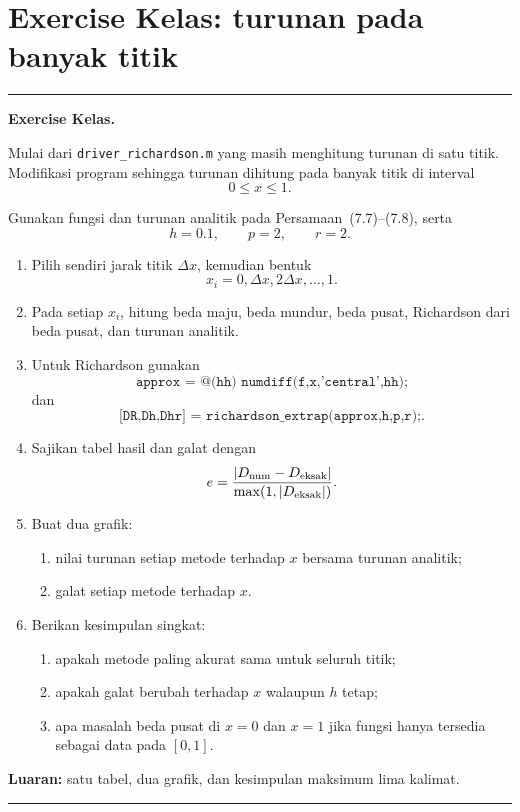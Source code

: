 \documentclass[book,english,noindex,lean,nobackpage,nocopyright,noupdate,nofiglist,notablist]{enacom}
\begin{document}
\section{Exercise Kelas: turunan pada banyak titik}
\par\medskip\noindent
\begin{center}
\begin{minipage}{0.94\textwidth}
\hrule\medskip
\textbf{Exercise Kelas.}\par\smallskip
Mulai dari \texttt{driver\_richardson.m} yang masih menghitung turunan di satu titik.
Modifikasi program sehingga turunan dihitung pada banyak titik di interval
\[
0\le x\le 1.
\]

Gunakan fungsi dan turunan analitik pada Persamaan~(7.7)--(7.8), serta
\[
h=0.1,\qquad p=2,\qquad r=2.
\]

\begin{enumerate}
\item Pilih sendiri jarak titik $\Delta x$, kemudian bentuk
\[
x_i=0,\Delta x,2\Delta x,\ldots,1.
\]

\item Pada setiap $x_i$, hitung beda maju, beda mundur, beda pusat, Richardson dari beda pusat,
dan turunan analitik.

\item Untuk Richardson gunakan
\[
\texttt{approx = @(hh) numdiff(f,x,'central',hh);}
\]
dan
\[
\texttt{[DR,Dh,Dhr] = richardson\_extrap(approx,h,p,r);}.
\]

\item Sajikan tabel hasil dan galat dengan
\[
e=\frac{|D_{\rm num}-D_{\rm eksak}|}{\max(1,|D_{\rm eksak}|)}.
\]

\item Buat dua grafik:
\begin{enumerate}
\item nilai turunan setiap metode terhadap $x$ bersama turunan analitik;
\item galat setiap metode terhadap $x$.
\end{enumerate}

\item Berikan kesimpulan singkat:
\begin{enumerate}
\item apakah metode paling akurat sama untuk seluruh titik;
\item apakah galat berubah terhadap $x$ walaupun $h$ tetap;
\item apa masalah beda pusat di $x=0$ dan $x=1$ jika fungsi hanya tersedia sebagai data pada $[0,1]$.
\end{enumerate}
\end{enumerate}

\textbf{Luaran:} satu tabel, dua grafik, dan kesimpulan maksimum lima kalimat.
\medskip\hrule
\end{minipage}
\end{center}
\medskip
\end{document}
